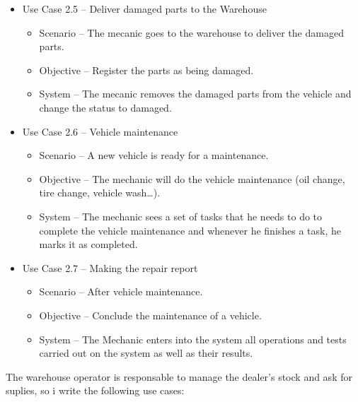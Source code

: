 \begin{itemize}
    \item Use Case 2.5 – Deliver damaged parts to the Warehouse
    \begin{itemize}
      \item Scenario – The mecanic goes to the warehouse to deliver the damaged parts.
      \item Objective – Register the parts as being damaged.
      \item System – The mecanic removes the damaged parts from the vehicle and change the status to damaged.
    \end{itemize}
\item Use Case 2.6 – Vehicle maintenance
\begin{itemize}
  \item Scenario – A new vehicle is ready for a maintenance.
  \item Objective – The mechanic will do the vehicle maintenance (oil change, tire change, vehicle wash…).
  \item System – The mechanic sees a set of tasks that he needs to do to complete the vehicle maintenance and whenever he finishes a task, he marks it as completed.
\end{itemize}
\item Use Case 2.7 – Making the repair report
\begin{itemize}
  \item Scenario – After vehicle maintenance.
  \item Objective – Conclude the maintenance of a vehicle.
  \item System – The Mechanic enters into the system all operations and tests carried out on the system as well as their results.
\end{itemize}
\end{itemize}
\hfill \break

The warehouse operator is responsable to manage the dealer's stock and ask for suplies, so i write the following use cases:

